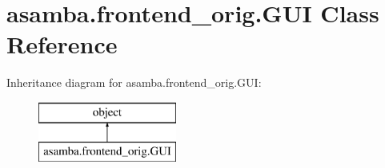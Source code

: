 \hypertarget{classasamba_1_1frontend__orig_1_1_g_u_i}{}\section{asamba.\+frontend\+\_\+orig.\+G\+UI Class Reference}
\label{classasamba_1_1frontend__orig_1_1_g_u_i}
Inheritance diagram for asamba.\+frontend\+\_\+orig.\+G\+UI\+:\begin{figure}[H]
\begin{center}
\leavevmode
\includegraphics[height=2.000000cm]{classasamba_1_1frontend__orig_1_1_g_u_i}
\end{center}
\end{figure}

